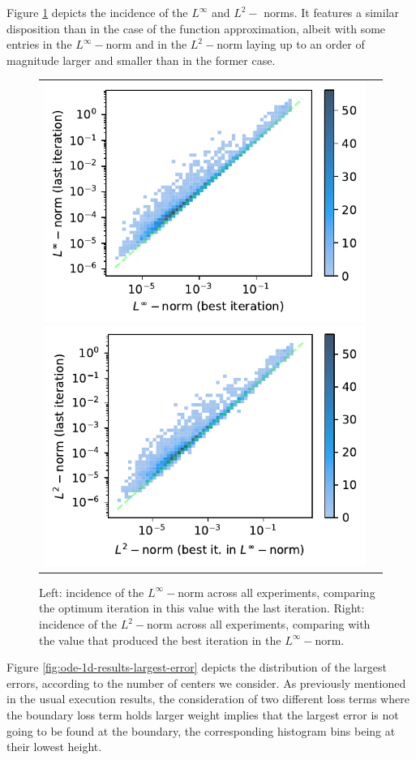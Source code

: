 \documentclass[12pt]{report} %
\begin{document}
Figure \ref{fig:ode-1d-results-incidence-l-norms} depicts the incidence of the $L^\infty$ and $L^2-$ norms. It features a similar disposition than in the case of the function approximation, albeit with some entries in the $L^\infty-$norm and in the $L^2-$norm laying up to an order of magnitude larger and smaller than in the former case.

\begin{figure}[h]
  \hspace*{-2cm}
  \begin{tabular}{cc}
    \includegraphics[width=.6\textwidth]{imagenes/experiments/1d/ode/incidence_of_linf.pdf}
  \includegraphics[width=.6\textwidth]{imagenes/experiments/1d/ode/incidence_of_l2.pdf}
  \end{tabular}
  \caption{Left: incidence of the $L^\infty-$norm across all experiments, comparing the optimum iteration in this value with the last iteration. Right: incidence of the $L^2-$norm across all experiments, comparing with the value that produced the best iteration in the $L^\infty-$norm.}
  \label{fig:ode-1d-results-incidence-l-norms}
\end{figure}

Figure \ref{fig:ode-1d-results-largest-error} depicts the distribution of the largest errors, according to the number of centers we consider. As previously mentioned in the usual execution results, the consideration of two different loss terms where the boundary loss term holds larger weight implies that the largest error is not going to be found at the boundary, the corresponding histogram bins being at their lowest height.
\end{document}
